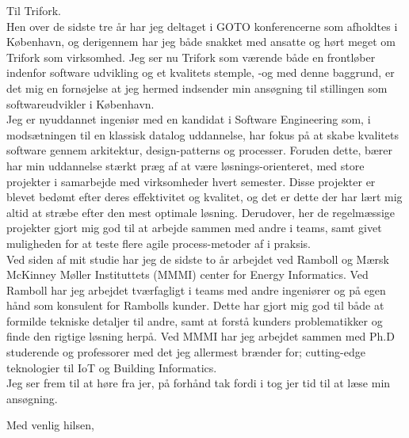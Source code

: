 \documentclass[10pt,a4paper]{altacv}
\begin{document}
Til Trifork.
\\
\vspace{5mm}
Hen over de sidste tre år har jeg deltaget i GOTO konferencerne som afholdtes i København, og derigennem har jeg både snakket med ansatte og hørt meget om Trifork som virksomhed.
Jeg ser nu Trifork som værende både en frontløber indenfor software udvikling og et kvalitets stemple, -og med denne baggrund, er det mig en fornøjelse at jeg hermed indsender min ansøgning til stillingen som softwareudvikler i København.
\\
\vspace{5mm}
Jeg er nyuddannet ingeniør med en kandidat i Software Engineering som, i modsætningen til en klassisk datalog uddannelse, har fokus på at skabe kvalitets software gennem arkitektur, design-patterns og processer.
Foruden dette, bærer har min uddannelse stærkt præg af at være løsnings-orienteret, med store projekter i samarbejde med virksomheder hvert semester.
Disse projekter er blevet bedømt efter deres effektivitet og kvalitet, og det er dette der har lært mig altid at stræbe efter den mest optimale løsning.
Derudover, her de regelmæssige projekter gjort mig god til at arbejde sammen med andre i teams, samt givet muligheden for at teste flere agile process-metoder af i praksis.
\\
\vspace{5mm}
Ved siden af mit studie har jeg de sidste to år arbejdet ved Ramboll og Mærsk McKinney Møller Instituttets (MMMI) center for Energy Informatics.
Ved Ramboll har jeg arbejdet tværfagligt i teams med andre ingeniører og på egen hånd som konsulent for Rambolls kunder.
Dette har gjort mig god til både at formilde tekniske detaljer til andre, samt at forstå kunders problematikker og finde den rigtige løsning herpå.
Ved MMMI har jeg arbejdet sammen med Ph.D studerende og professorer med det jeg allermest brænder for; cutting-edge teknologier til IoT og Building Informatics.
\\
\vspace{5mm} 
Jeg ser frem til at høre fra jer, på forhånd tak fordi i tog jer tid til at læse min ansøgning.


\vspace{5mm}
Med venlig hilsen,\\
\end{document}
